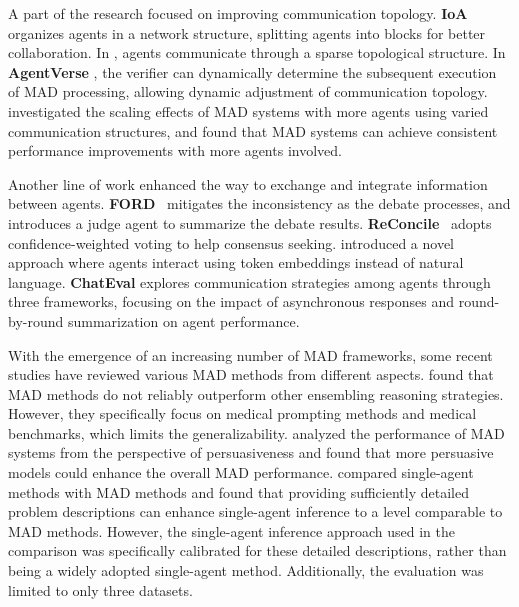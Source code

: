 A part of the research focused on improving communication topology. 
\textbf{IoA}~\citep{chen2024IoA} organizes agents in a network structure, splitting agents into blocks for better collaboration. In \citep{li2024Sparse}, agents communicate through a sparse topological structure. In \textbf{AgentVerse} \citep{chen2023agentverse}, the verifier can dynamically determine the subsequent execution of MAD processing, allowing dynamic adjustment of communication topology. \cite{qian2024scaling} investigated the scaling effects of MAD systems with more agents using varied communication structures, and found that MAD systems can achieve consistent performance improvements with more agents involved.

Another line of work enhanced the way to exchange and integrate information between agents. \textbf{FORD}~\citep{xiong-FORD} mitigates the inconsistency as the debate processes, and introduces a judge agent to summarize the debate results. \textbf{ReConcile}~\citep{chen2024reconcile} adopts confidence-weighted voting to help consensus seeking. \cite{pham2023let} introduced a novel approach where agents interact using token embeddings instead of natural language. 
\textbf{ChatEval} \citep{chanchateval} explores communication strategies among agents through three frameworks, focusing on the impact of asynchronous responses and round-by-round summarization on agent performance.

With the emergence of an increasing number of MAD frameworks, some recent studies have reviewed various MAD methods from different aspects. \cite{smit2023we} found that MAD methods do not reliably outperform other ensembling reasoning strategies. However, they specifically focus on medical prompting methods and medical benchmarks, which limits the generalizability. 
\cite{khan2024debating} analyzed the performance of MAD systems from the perspective of persuasiveness and found that more persuasive models could enhance the overall MAD performance. \cite{wang2024rethinking} compared single-agent methods with MAD methods and found that providing sufficiently detailed problem descriptions can enhance single-agent inference to a level comparable to MAD methods. However, the single-agent inference approach used in the comparison was specifically calibrated for these detailed descriptions, rather than being a widely adopted single-agent method. Additionally, the evaluation was limited to only three datasets.

